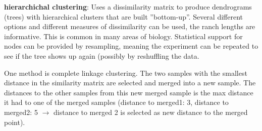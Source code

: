 \documentclass{article}
\begin{document}
\textbf{hierarchichal clustering}: Uses a dissimilarity matrix to produce dendrograms (trees) with hierarchical clusters that are built ”bottom-up”. Several different options and different measures of dissimilarity can be used, the ranch lengths are informative. This is common in many areas of biology. Statistical support for nodes can be provided by resampling, meaning the experiment can be repeated to see if the tree shows up again (possibly by reshuffling the data.\par 
One method is complete linkage clustering. The two samples with the smallest distance in the similarity matrix are selected and merged into a new sample. The distances to the other samples from this new merged sample is the max distance it had to one of the merged samples (distance to merged1: 3, distance to merged2: 5 $\rightarrow$ distance to merged 2 is selected as new distance to the merged point).
\end{document}
